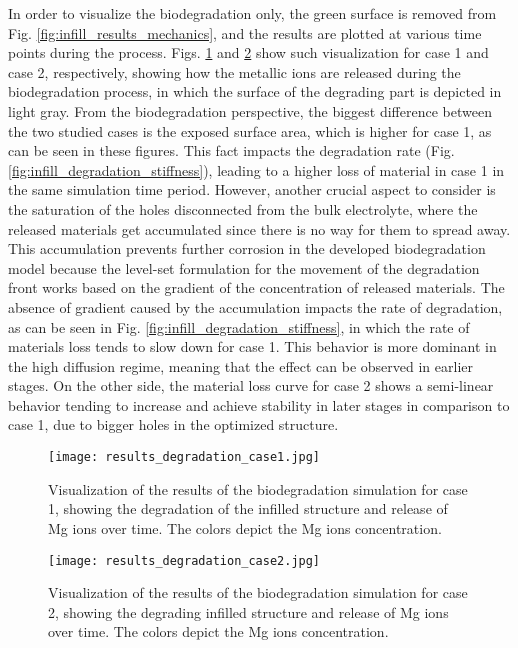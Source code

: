 In order to visualize the biodegradation only, the green surface is removed from Fig. \ref{fig:infill_results_mechanics}, and the results are plotted at various time points during the process. Figs. \ref{fig:infill_results_degradation_case1} and \ref{fig:infill_results_degradation_case2} show such visualization for case 1 and case 2, respectively, showing how the metallic ions are released during the biodegradation process, in which the surface of the degrading part is depicted in light gray. From the biodegradation perspective, the biggest difference between the two studied cases is the exposed surface area, which is higher for case 1, as can be seen in these figures. This fact impacts the degradation rate (Fig. \ref{fig:infill_degradation_stiffness}), leading to a higher loss of material in case 1 in the same simulation time period. However, another crucial aspect to consider is the saturation of the holes disconnected from the bulk electrolyte, where the released materials get accumulated since there is no way for them to spread away. This accumulation prevents further corrosion in the developed biodegradation model because the level-set formulation for the movement of the degradation front works based on the gradient of the concentration of released materials. The absence of gradient caused by the accumulation impacts the rate of degradation, as can be seen in Fig. \ref{fig:infill_degradation_stiffness}, in which the rate of materials loss tends to slow down for case 1. This behavior is more dominant in the high diffusion regime, meaning that the effect can be observed in earlier stages. On the other side, the material loss curve for case 2 shows a semi-linear behavior tending to increase and achieve stability in later stages in comparison to case 1, due to bigger holes in the optimized structure.

\begin{figure}[h]
\centering
\medskip
\texttt{[image: results\_degradation\_case1.jpg]}
\caption[Visualization of the results of the biodegradation simulation for case 1]{Visualization of the results of the biodegradation simulation for case 1, showing the degradation of the infilled structure and release of Mg ions over time. The colors depict the Mg ions concentration.} \label{fig:infill_results_degradation_case1}
\end{figure}


\begin{figure}[h]
\centering
\medskip
\texttt{[image: results\_degradation\_case2.jpg]}
\caption[Visualization of the results of the biodegradation simulation for case 2]{Visualization of the results of the biodegradation simulation for case 2, showing the degrading infilled structure and release of Mg ions over time. The colors depict the Mg ions concentration.} \label{fig:infill_results_degradation_case2}
\end{figure}

